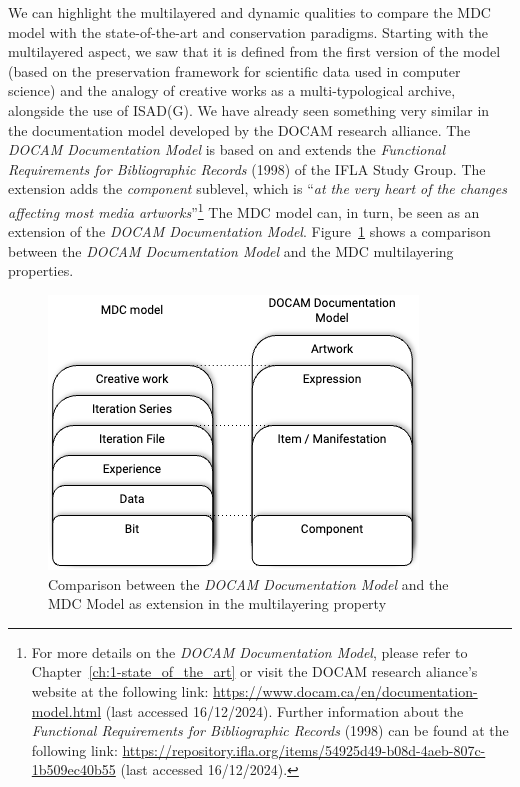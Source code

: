 We can highlight the multilayered and dynamic qualities to compare the MDC model with the state-of-the-art and conservation paradigms. Starting with the multilayered aspect, we saw that it is defined from the first version of the model (based on the preservation framework for scientific data used in computer science) and the analogy of creative works as a multi-typological archive, alongside the use of ISAD(G). We have already seen something very similar in the documentation model developed by the DOCAM research alliance. The \textit{DOCAM Documentation Model} is based on and extends the \textit{Functional Requirements for Bibliographic Records} (1998) \cite{plassard1998functional} of the IFLA Study Group. The extension adds the \textit{component} sublevel, which is ``\textit{at the very heart of the changes affecting most media artworks}''\footnote{For more details on the \textit{DOCAM Documentation Model}, please refer to Chapter~\ref{ch:1-state_of_the_art} or visit the DOCAM research aliance's website at the following link: \url{https://www.docam.ca/en/documentation-model.html} (last accessed 16/12/2024). Further information about the \textit{Functional Requirements for Bibliographic Records} (1998) can be found at the following link: \url{https://repository.ifla.org/items/54925d49-b08d-4aeb-807c-1b509ec40b55} (last accessed 16/12/2024).} The MDC model can, in turn, be seen as an extension of the \textit{DOCAM Documentation Model}. Figure~\ref{fig:c3-mdc-docam} shows a comparison between the \textit{DOCAM Documentation Model} and the MDC multilayering properties.

\begin{figure}[!h]
    \centering
    \includegraphics[width=0.5\linewidth]{chapters/3-mdc_model-reactivation_workflow-instruction_template/image/graph03-mdc-docam.png}
    \caption{Comparison between the \textit{DOCAM Documentation Model} and the MDC Model as extension in the multilayering property}
    \label{fig:c3-mdc-docam}
\end{figure}

